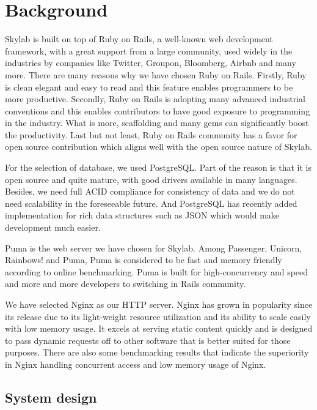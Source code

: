 \chapter{Background}

Skylab is built on top of Ruby on Rails, a well-known web development framework, with a great support from a large community, used widely in the industries by companies like Twitter, Groupon, Bloomberg, Airbnb and many more\cite{citation1}. There are many reasons why we have chosen Ruby on Rails. Firstly, Ruby is clean elegant and easy to read and this feature enables programmers to be more productive. Secondly, Ruby on Rails is adopting many advanced industrial conventions and this enables contributors to have good exposure to programming in the industry. What is more, scaffolding and many gems can significantly boost the productivity. Last but not least, Ruby on Rails community has a favor for open source contribution which aligns well with the open source nature of Skylab.

For the selection of database, we used PostgreSQL. Part of the reason is that it is open source and quite mature, with good drivers available in many languages\cite{citation2}. Besides, we need full ACID compliance for consistency of data and we do not need scalability in the foreseeable future. And PostgreSQL has recently added implementation for rich data structures such as JSON which would make development much easier\cite{citation3}.

Puma is the web server we have chosen for Skylab. Among Passenger, Unicorn, Rainbows! and Puma, Puma is considered to be fast and memory friendly according to online benchmarking\cite{citation4}. Puma is built for high-concurrency and speed and more and more developers to switching in Rails community\cite{citation5}.

We have selected Nginx as our HTTP server. Nginx has grown in popularity since its release due to its light-weight resource utilization and its ability to scale easily with low memory usage. It excels at serving static content quickly and is designed to pass dynamic requests off to other software that is better suited for those purposes\cite{citation6}. There are also some benchmarking results that indicate the superiority in Nginx handling concurrent access and low memory usage of Nginx\cite{citation7}.

\section{System design}

